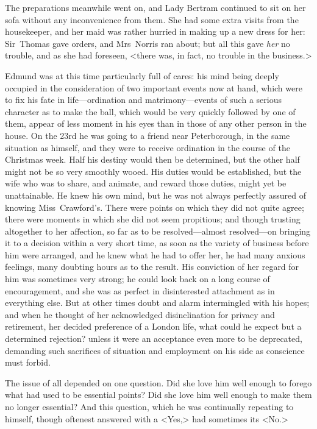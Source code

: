 The preparations meanwhile went on, and Lady Bertram continued to sit on her sofa without any inconvenience from them. She had some extra visits from the housekeeper, and her maid was rather hurried in making up a new dress for her: Sir~Thomas gave orders, and Mrs~Norris ran about; but all this gave \textit{her}  no trouble, and as she had foreseen, <there was, in fact, no trouble in the business.>

Edmund was at this time particularly full of cares: his mind being deeply occupied in the consideration of two important events now at hand, which were to fix his fate in life—ordination and matrimony—events of such a serious character as to make the ball, which would be very quickly followed by one of them, appear of less moment in his eyes than in those of any other person in the house. On the 23rd he was going to a friend near Peterborough, in the same situation as himself, and they were to receive ordination in the course of the Christmas week. Half his destiny would then be determined, but the other half might not be so very smoothly wooed. His duties would be established, but the wife who was to share, and animate, and reward those duties, might yet be unattainable. He knew his own mind, but he was not always perfectly assured of knowing Miss~Crawford's. There were points on which they did not quite agree; there were moments in which she did not seem propitious; and though trusting altogether to her affection, so far as to be resolved—almost resolved—on bringing it to a decision within a very short time, as soon as the variety of business before him were arranged, and he knew what he had to offer her, he had many anxious feelings, many doubting hours as to the result. His conviction of her regard for him was sometimes very strong; he could look back on a long course of encouragement, and she was as perfect in disinterested attachment as in everything else. But at other times doubt and alarm intermingled with his hopes; and when he thought of her acknowledged disinclination for privacy and retirement, her decided preference of a London life, what could he expect but a determined rejection? unless it were an acceptance even more to be deprecated, demanding such sacrifices of situation and employment on his side as conscience must forbid.

The issue of all depended on one question. Did she love him well enough to forego what had used to be essential points? Did she love him well enough to make them no longer essential? And this question, which he was continually repeating to himself, though oftenest answered with a <Yes,> had sometimes its <No.>

